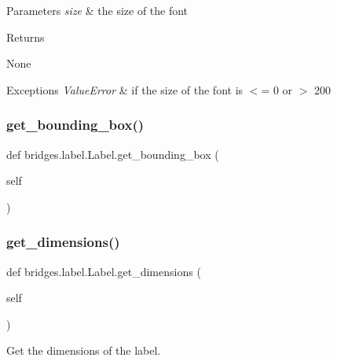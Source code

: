 \begin{DoxyParams}{Parameters}
{\em size} & the size of the font \\
\hline
\end{DoxyParams}
\begin{DoxyReturn}{Returns}


None
\end{DoxyReturn}

\begin{DoxyExceptions}{Exceptions}
{\em Value\+Error} & if the size of the font is $<$= 0 or $>$ 200 \\
\hline
\end{DoxyExceptions}
\mbox{\label{classbridges_1_1label_1_1_label_a11238ce7c802801d3a978fa367cc66f0}} 
\subsubsection{\texorpdfstring{get\+\_\+bounding\+\_\+box()}{get\_bounding\_box()}}
{\footnotesize\ttfamily def bridges.\+label.\+Label.\+get\+\_\+bounding\+\_\+box (\begin{DoxyParamCaption}\item[{}]{self }\end{DoxyParamCaption})}

\mbox{\label{classbridges_1_1label_1_1_label_a627bc596c7e3db837e3b1575282e1b98}} 
\subsubsection{\texorpdfstring{get\+\_\+dimensions()}{get\_dimensions()}}
{\footnotesize\ttfamily def bridges.\+label.\+Label.\+get\+\_\+dimensions (\begin{DoxyParamCaption}\item[{}]{self }\end{DoxyParamCaption})}



Get the dimensions of the label. 

